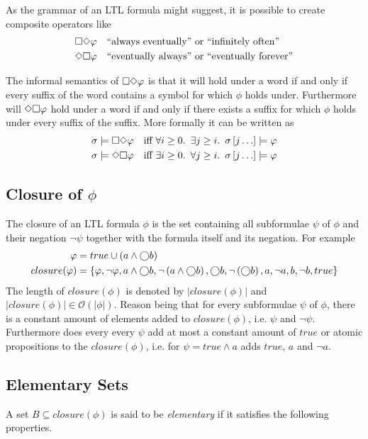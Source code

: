 As the grammar of an LTL formula might suggest, it is possible to create composite operators like
\begin{align*}
    &\square\Diamond\varphi \quad \text{``always eventually'' or ``infinitely often''}\\
    &\Diamond\square\varphi \quad \text{``eventually always'' or ``eventually forever''}
\end{align*}

The informal semantics of $\square\Diamond\varphi$ is that it will hold under a word if and only if every suffix of the word contains a symbol for which $\phi$ holds under. Furthermore will $\Diamond\square\varphi$ hold under a word if and only if there exists a suffix for which $\phi$ holds under every suffix of the suffix. More formally it can be written as
\begin{align*}
    \sigma &\models \square\Diamond \varphi &\text{iff }& \forall i \geq 0.\enskip \exists j \geq i.\enskip \sigma\left[j\ldots\right] \models \varphi \\
    \sigma &\models \Diamond\square \varphi &\text{iff }& \exists i \geq 0.\enskip \forall j \geq i.\enskip \sigma\left[j\ldots\right] \models \varphi
\end{align*}

\subsection{Closure of $\phi$}
The closure of an LTL formula $\phi$ is the set containing all subformulae $\psi$ of $\phi$ and their negation $\lnot \psi$ together with the formula itself and its negation. For example
\begin{align*}
    \varphi &= true \cup \left( a \land \bigcirc b \right) \\
    closure(\varphi) &= \left\{ \varphi, \lnot \varphi, a \land \bigcirc b, \lnot \left( a \land \bigcirc b \right), \bigcirc b, \lnot \left( \bigcirc b \right), a, \lnot a, b, \lnot b, true \right\}
\end{align*}
The length of $closure(\phi)$ is denoted by $|closure(\phi)|$ and $|closure(\phi)| \in \mathcal{O}\left(|\phi|\right)$. Reason being that for every subformulae $\psi$ of $\phi$, there is a constant amount of elements added to $closure(\phi)$, i.e. $\psi$ and $\lnot \psi$. Furthermore does every every $\psi$ add at most a constant amount of $true$ or atomic propositions to the $closure(\phi)$, i.e. for $\psi = true \land a$ adds $true$, $a$ and $\lnot a$.

\subsection{Elementary Sets}
\label{sec:elemesets}
A set $B \subseteq closure(\phi)$ is said to be \emph{elementary} if it satisfies the following properties.

